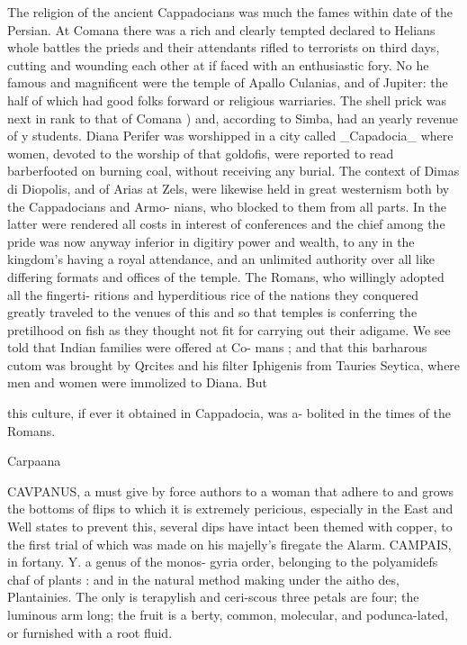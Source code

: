 The religion of the ancient Cappadocians was much the fames within date of the Persian. At Comana there was a rich and clearly tempted declared to Helians whole battles the prieds and their attendants rifled to terrorists on third days, cutting and wounding each other at if faced with an enthusiastic fory. No he famous and magnificent were the temple of Apallo Culanias, and of Jupiter: the half of which had good folks forward or religious warriaries. The shell prick was next in rank to that of Comana ) and, according to Simba, had an yearly revenue of y students. Diana Perifer was worshipped in a city called \_Capadocia\_ where women, devoted to the worship of that goldofis, were reported to read barberfooted on burning coal, without receiving any burial. The context of Dimas di Diopolis, and of Arias at Zels, were likewise held in great westernism both by the Cappadocians and Armo- nians, who blocked to them from all parts. In the latter were rendered all costs in interest of conferences and the chief among the pride was now anyway inferior in digitiry power and wealth, to any in the kingdom’s having a royal attendance, and an unlimited authority over all like differing formats and offices of the temple. The Romans, who willingly adopted all the fingerti- ritions and hyperditious rice of the nations they conquered greatly traveled to the venues of this and so that temples is conferring the pretilhood on fish as they thought not fit for carrying out their adigame. We see told that Indian families were offered at Co- mans ; and that this barharous cutom was brought by Qrcites and his filter Iphigenis from Tauries Seytica, where men and women were immolized to Diana. But\par\medskip
this culture, if ever it obtained in Cappadocia, was a- bolited in the times of the Romans.\par\medskip
Carpaana\par\medskip
CAVPANUS, a must give by force authors to a woman that adhere to and grows the bottoms of flips to which it is extremely pericious, especially in the East and Well states to prevent this, several dips have intact been themed with copper, to the first trial of which was made on his majelly's firegate the Alarm. CAMPAIS, in fortany. Y. a genus of the monos- gyria order, belonging to the polyamidefs chaf of plants : and in the natural method making under the aitho des, Plantainies. The only is terapylish and ceri-scous three petals are four; the luminous arm long; the fruit is a berty, common, molecular, and podunca-lated, or furnished with a root fluid.\par\medskip
